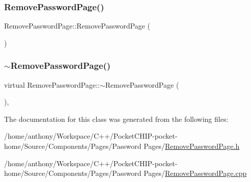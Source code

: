 \subsubsection{\texorpdfstring{Remove\+Password\+Page()}{RemovePasswordPage()}}
{\footnotesize\ttfamily Remove\+Password\+Page\+::\+Remove\+Password\+Page (\begin{DoxyParamCaption}{ }\end{DoxyParamCaption})}

\mbox{\label{classRemovePasswordPage_a0283a1f0c381359d2fcec91d08deb9ce}} 
\subsubsection{\texorpdfstring{$\sim$\+Remove\+Password\+Page()}{~RemovePasswordPage()}}
{\footnotesize\ttfamily virtual Remove\+Password\+Page\+::$\sim$\+Remove\+Password\+Page (\begin{DoxyParamCaption}{ }\end{DoxyParamCaption})\hspace{0.3cm}{\ttfamily [inline]}, {\ttfamily [virtual]}}



The documentation for this class was generated from the following files\+:\begin{DoxyCompactItemize}
\item 
/home/anthony/\+Workspace/\+C++/\+Pocket\+C\+H\+I\+P-\/pocket-\/home/\+Source/\+Components/\+Pages/\+Password Pages/\mbox{\hyperlink{RemovePasswordPage_8h}{Remove\+Password\+Page.\+h}}\item 
/home/anthony/\+Workspace/\+C++/\+Pocket\+C\+H\+I\+P-\/pocket-\/home/\+Source/\+Components/\+Pages/\+Password Pages/\mbox{\hyperlink{RemovePasswordPage_8cpp}{Remove\+Password\+Page.\+cpp}}\end{DoxyCompactItemize}
